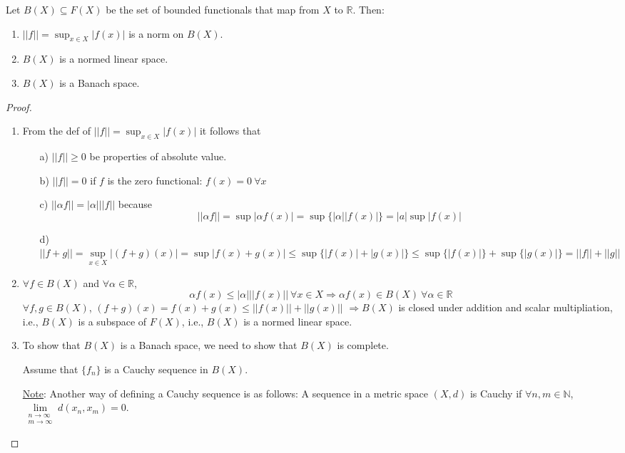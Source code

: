 \documentclass[twoside]{article}
\newcommand\imp{$\Longrightarrow$}
\newcommand\R{\mathbb{R}}
\begin{document}
 \begin{theorem}
    Let $B(X) \subseteq F(X)$ be the set of bounded functionals that map from $X$ to $\R$. Then:
    \begin{enumerate}
        \item $||f|| = \sup_{x\in X} |f(x)|$ is a norm on $B(X)$.
        \item $B(X)$ is a normed linear space.
        \item $B(X)$ is a Banach space.
    \end{enumerate}
 \end{theorem}
\begin{proof}
    \begin{enumerate}
        \item From the def of $||f|| = \sup_{x\in X} |f(x)|$ it follows that
        \begin{itemize}
            \item [a)] $||f|| \geq 0$ be properties of absolute value.
            \item [b)] $||f|| = 0$ if $f$ is the zero functional: $f(x) = 0 ~ \forall x$
            \item [c)] $||\alpha f || = |\alpha| ||f||$
            because
            \[
            || \alpha f|| = \sup |\alpha f(x)| = \sup \{ |\alpha| |f(x)| \} = |a| \sup |f(x)|
            \]
            \item [d)] $||f+g|| = \sup\limits_{x\in X} |(f+ g)(x)| = \sup |f(x) + g(x)| \leq \sup \{ |f(x)| + |g(x)|\} \leq \sup \{ |f(x)|\} + \sup \{|g(x)|\}  = ||f|| + ||g|| $
        \end{itemize}
        \item $\forall f \in B(X)$ and $\forall \alpha \in \R$,
            \[
            \alpha f(x) \leq |\alpha| ||f(x)|| ~\forall x \in X \Longrightarrow \alpha f(x) \in B(X) ~ \forall \alpha \in \R
            \]
            $\forall f,g \in B(X)$, $(f+g)(x) = f(x) + g(x) \leq ||f(x)|| + ||g(x)||$ \imp $B(X)$ is closed under addition and scalar multipliation, i.e., $B(X)$ is a subspace of $F(X)$, i.e., $B(X)$ is a normed linear space.
        \item To show that $B(X)$ is a Banach space, we need to show that $B(X)$ is complete. 

        Assume that $\{f_{n}\}$ is a Cauchy sequence in $B(X)$.

        \underline{Note}: Another way of defining a Cauchy sequence is as follows: A sequence in a metric space $(X,d)$ is Cauchy if $\forall n,m \in \mathbb{N}$, $\lim\limits_{\substack{
            n \to \infty\\
            m \to \infty}
            } d(x_{n},x_{m}) = 0$.


\end{enumerate}
\end{proof}
\end{document}
